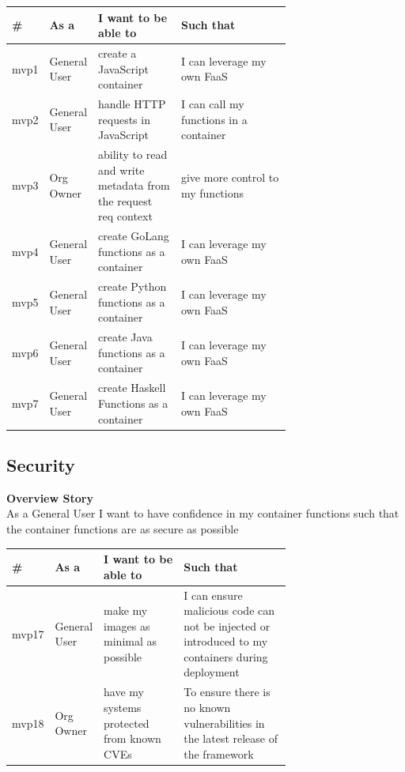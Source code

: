 \begin{table}[!ht]
\begin{tabular}{|l|l|p{0.3\linewidth}|p{0.4\linewidth}|}
\hline
\textbf{\#} & \textbf{As a} & \textbf{I want to be able to}                                   & \textbf{Such that}                     \\ \hline
mvp1        & General User  & create a JavaScript container                                   & I can leverage my own FaaS             \\ \hline
mvp2        & General User  & handle HTTP requests in JavaScript                              & I can call my functions in a container \\ \hline
mvp3        & Org Owner     & ability to read and write metadata from the request req context & give more control to my functions      \\ \hline
mvp4        & General User  & create GoLang functions as a container                          & I can leverage my own FaaS             \\ \hline
mvp5        & General User  & create Python functions as a container                          & I can leverage my own FaaS             \\ \hline
mvp6        & General User  & create Java functions as a container                            & I can leverage my own FaaS             \\ \hline
mvp7        & General User  & create Haskell Functions as a container                         & I can leverage my own FaaS             \\ \hline
\end{tabular}
\end{table}

\subsection{Security}
\textbf{Overview Story}
\\As a General User I want to have confidence in my container functions such that the container functions are as secure as possible

\begin{table}[!ht]
\begin{tabular}{|l|l|p{0.3\linewidth}|p{0.4\linewidth}|}
\hline
\textbf{\#} & \textbf{As a} & \textbf{I want to be able to}             & \textbf{Such that}                                                                               \\ \hline
mvp17       & General User  & make my images as minimal as possible     & I can ensure malicious code can not be injected or introduced to my containers during deployment \\ \hline
mvp18       & Org Owner     & have my systems protected from known CVEs & To ensure there is no known vulnerabilities in the latest release of the framework               \\ \hline
\end{tabular}
\end{table}

